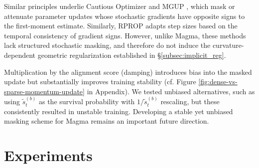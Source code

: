 \documentclass[11pt, a4paper, twocolumn, copyright, goog]{google}
\theoremstyle{plain}
\theoremstyle{definition}
\theoremstyle{remark}
\begin{document}
Similar principles underlie Cautious Optimizer \citep{liang2024cautious} and MGUP \citep{chang2025mgup}, which mask or attenuate parameter updates whose stochastic gradients have opposite signs to the first-moment estimate. Similarly, RPROP \citep{riedmiller1993direct} adapts step sizes based on the temporal consistency of gradient signs.
However, unlike Magma, these methods lack structured stochastic masking, and therefore do not induce the curvature-dependent geometric regularization established in \S \ref{subsec:implicit_reg}. 


Multiplication by the alignment score (damping) introduces bias into the masked update but substantially improves training stability (cf. Figure \ref{fig:dense-vs-sparse-momentum-update} in Appendix). We tested unbiased alternatives, such as using $\tilde{s}_t^{(b)}$ as the survival probability with $1/\tilde{s}_t^{(b)}$ rescaling, but these consistently resulted in unstable training. Developing a stable yet unbiased masking scheme for Magma remains an important future direction.




\section{Experiments}
\end{document}
